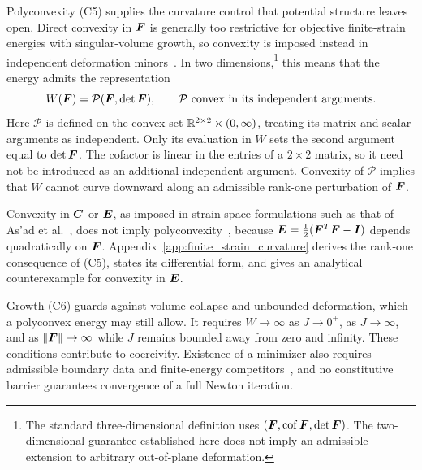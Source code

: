 Polyconvexity (C5) supplies the curvature control that potential structure leaves open. Direct convexity in $\bm F$ is generally too restrictive for objective finite-strain energies with singular-volume growth, so convexity is imposed instead in independent deformation minors~\cite{ball1977,Ciarlet1988}. In two dimensions,\footnote{The standard three-dimensional definition uses $(\bm F,\operatorname{cof}\bm F,\det\bm F)$. The two-dimensional guarantee established here does not imply an admissible extension to arbitrary out-of-plane deformation.} this means that the energy admits the representation
\begin{equation}
 W(\bm F)=\mathcal P(\bm F,\det\bm F),\qquad
 \mathcal P\text{ convex in its independent arguments}.
 \label{eq:polyconvex_definition}
\end{equation}
Here $\mathcal P$ is defined on the convex set $\mathbb R^{2\times2}\times(0,\infty)$, treating its matrix and scalar arguments as independent. Only its evaluation in $W$ sets the second argument equal to $\det\bm F$. The cofactor is linear in the entries of a $2\times2$ matrix, so it need not be introduced as an additional independent argument. Convexity of $\mathcal P$ implies that $W$ cannot curve downward along an admissible rank-one perturbation of $\bm F$.

Convexity in $\bm C$ or $\bm E$, as imposed in strain-space formulations such as that of As'ad et al.~\cite{asad2022}, does not imply polyconvexity~\cite{GaoNeffRoventaThiel2017}, because $\bm E=\tfrac12(\bm F^T\bm F-\bm I)$ depends quadratically on $\bm F$. Appendix~\ref{app:finite_strain_curvature} derives the rank-one consequence of (C5), states its differential form, and gives an analytical counterexample for convexity in $\bm E$.

Growth (C6) guards against volume collapse and unbounded deformation, which a polyconvex energy may still allow. It requires $W\to\infty$ as $J\to0^+$, as $J\to\infty$, and as $\|\bm F\|\to\infty$ while $J$ remains bounded away from zero and infinity. These conditions contribute to coercivity. Existence of a minimizer also requires admissible boundary data and finite-energy competitors~\cite{Ciarlet1988}, and no constitutive barrier guarantees convergence of a full Newton iteration.
